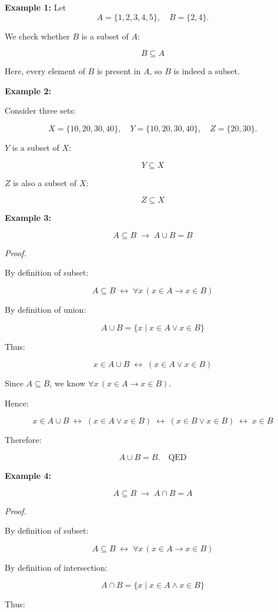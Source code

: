 \documentclass[12pt,a4paper,openany]{article}
\begin{document}
\textbf{Example 1:}
Let  
\[
A = \{1,2,3,4,5\}, \quad B = \{2,4\}.
\]  

We check whether $B$ is a subset of $A$:

\[
B \subseteq A
\]  

Here, every element of $B$ is present in $A$, so $B$ is indeed a subset.

\textbf{Example 2:}

Consider three sets:

\[
X = \{10,20,30,40\}, \quad 
Y = \{10,20,30,40\}, \quad
Z = \{20,30\}.
\]  

$Y$ is a subset of $X$:

\[
Y \subseteq X
\]

$Z$ is also a subset of $X$:

\[
Z \subseteq X
\]


\textbf{Example 3:}

\[
A \subseteq B \;\to\; A \cup B = B
\]

\textit{Proof.}

By definition of subset:

\[
A \subseteq B \;\leftrightarrow\; \forall x \, (x \in A \to x \in B)
\]

By definition of union:

\[
A \cup B = \{x \mid x \in A \lor x \in B\}
\]

Thus:

\[
x \in A \cup B 
\;\leftrightarrow\;
(x \in A \lor x \in B)
\]

Since $A \subseteq B$, we know $\forall x \, (x \in A \to x \in B)$.  

Hence:

\[
x \in A \cup B
\;\leftrightarrow\;
(x \in A \lor x \in B)
\;\leftrightarrow\;
(x \in B \lor x \in B)
\;\leftrightarrow\;
x \in B
\]

Therefore:

\[
\boxed{A \cup B = B. \quad \text{QED}}
\]

\textbf{Example 4:}

\[
A \subseteq B \;\to\; A \cap B = A
\]

\textit{Proof.}

By definition of subset:

\[
A \subseteq B \;\leftrightarrow\; \forall x \, (x \in A \to x \in B)
\]

By definition of intersection:

\[
A \cap B = \{x \mid x \in A \land x \in B\}
\]

Thus:
\end{document}
